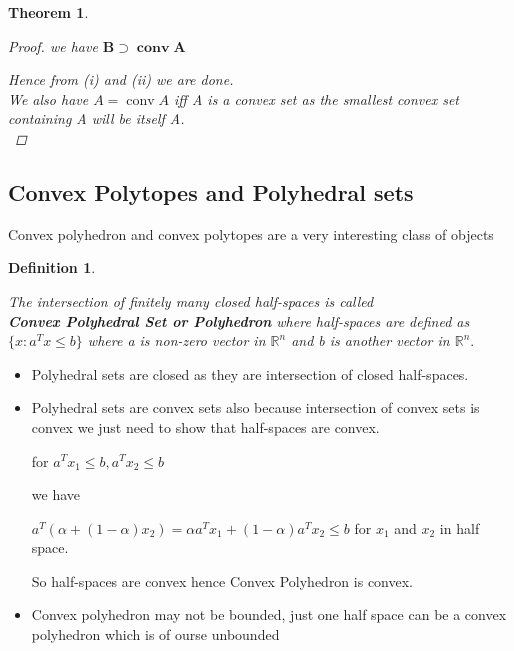\documentclass[oneside]{book}
\newtheorem{theorem}{Theorem}[section]
\newtheorem{mydef}{Definition}[section]
\begin{document}
\begin{theorem}
\begin{proof}
			we have  $ \mathbf{B} \supset \mathbf{\operatorname{conv} A}  $ \par
			Hence from (i) and (ii) we are done. \\
			We also have $A = \operatorname{conv} A$ iff A is a convex set as the smallest convex set containing A will be itself A. \\
			
		\end{proof}
		
	\end{theorem}
	
	
	
	
	
	
	
	
	
	
	
	
	
	
	
	
	
	
	
	
	
	
	
	
	
	
	
	
	
	
	
	
	
	
	\subsection{ Convex Polytopes and Polyhedral sets } \label{ss:16}
	Convex polyhedron and convex polytopes are a very interesting class of objects 
	\begin{mydef} \label{d:5}
		
		The intersection of finitely many closed half-spaces is called \\
		\textbf{ Convex Polyhedral Set  or Polyhedron}
		where half-spaces are defined as $\{ x : a^{T}x \leq b\} $  where a is non-zero vector in $\mathbb{R}^n$ and b is another vector in  $\mathbb{R}^n.$  
		
		
	\end{mydef}
	
	
	\begin{itemize}
		\item
		Polyhedral sets are closed as they are intersection of closed half-spaces. 
		\item
		Polyhedral sets  are convex sets  also because intersection of convex sets is convex we just need to show that half-spaces are convex.\par
		for $a^{T} x_{1} \leq b, a^{T} x_{2} \leq b$ \par 
		we have 
		
		$a^{T}\left(\alpha +(1- \alpha) x_{2}\right)=\alpha a^{T} x_{1}+(1-\alpha) a^{T} x_{2} \leq b$ 
		for $x_{1} $ and $x_{2}$ in half space.  \par
		So half-spaces are convex hence  Convex Polyhedron  is convex.\par 
		\item
		Convex polyhedron may not be bounded, just one half space can be a convex polyhedron which is of ourse unbounded 
	\end{itemize}
	
\end{document}
